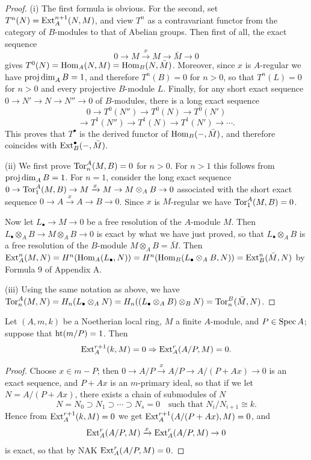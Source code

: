 \begin{proof}
(i) The first formula is obvious. For the second, set $T^n(N) =
\operatorname{Ext}^{n+1}_A(N, M)$, and view $T^n$ as a contravariant functor from the category
of $B$-modules to that of Abelian groups. Then first of all, the exact sequence
\[
  0 \to M \xrightarrow{x} M \to \bar{M} \to 0
\]
gives $T^0(N) = \operatorname{Hom}_A(N, M) = \operatorname{Hom}_B(N, \bar{M})$. Moreover, since $x$ is
$A$-regular we have $\operatorname{proj\,dim}_A B = 1$, and therefore $T^n(B) = 0$ for $n > 0$,
so that $T^n(L) = 0$ for $n > 0$ and every projective $B$-module $L$. Finally, for
any short exact sequence $0 \to N' \to N \to N'' \to 0$ of $B$-modules, there is
a long exact sequence
\[
  0 \to T^0(N'') \to T^0(N) \to T^0(N')
\]
\[
  \to T^1(N'') \to T^1(N) \to T^1(N') \to \cdots .
\]
This proves that $T^\bullet$ is the derived functor of $\operatorname{Hom}_B(-, \bar{M})$, and therefore
coincides with $\operatorname{Ext}^\bullet_B(-, \bar{M})$.

(ii) We first prove $\operatorname{Tor}^A_n(M, B) = 0$ for $n > 0$. For $n > 1$ this follows
from $\operatorname{proj\,dim}_A B = 1$. For $n = 1$, consider the long exact sequence
$0 \to \operatorname{Tor}^A_1(M, B) \to M \xrightarrow{x} M \to M \otimes_A B \to 0$ associated with the short
exact sequence $0 \to A \xrightarrow{x} A \to B \to 0$. Since $x$ is $M$-regular we have
$\operatorname{Tor}^A_1(M, B) = 0$.

Now let $L_\bullet \to M \to 0$ be a free resolution of the $A$-module $M$. Then
$L_\bullet \otimes_A B \to M \otimes_A B \to 0$ is exact by what we have just proved, so that
$L_\bullet \otimes_A B$ is a free resolution of the $B$-module $M \otimes_A B = \bar{M}$. Then $\operatorname{Ext}^n_A(M, N)
= H^n(\operatorname{Hom}_A(L_\bullet, N)) = H^n(\operatorname{Hom}_B(L_\bullet \otimes_A B, N)) = \operatorname{Ext}^n_B(\bar{M}, N)$ by Formula 9
of Appendix A.

(iii) Using the same notation as above, we have $\operatorname{Tor}^A_n(M, N) =
H_n(L_\bullet \otimes_A N) = H_n((L_\bullet \otimes_A B) \otimes_B N) = \operatorname{Tor}^B_n(\bar{M}, N)$.
\end{proof}

\begin{lemma}\label{lem:18.3}
Let $(A, m, k)$ be a Noetherian local ring, $M$ a finite $A$-module, and
$P \in \operatorname{Spec} A$; suppose that $\operatorname{ht} (m/P) = 1$. Then
\[
  \operatorname{Ext}^{r+1}_A(k, M) = 0 \Rightarrow \operatorname{Ext}^r_A(A/P, M) = 0.
\]
\end{lemma}

\begin{proof}
Choose $x \in m - P$; then $0 \to A/P \xrightarrow{x} A/P \to A/(P + Ax) \to 0$ is
an exact sequence, and $P + Ax$ is an $m$-primary ideal, so that if we let
$N = A/(P + Ax)$, there exists a chain of submodules of $N$
\[
  N = N_0 \supset N_1 \supset \cdots \supset N_s = 0 \quad \text{such that } N_i/N_{i+1} \cong k.
\]
Hence from $\operatorname{Ext}^{r+1}_A(k, M) = 0$ we get $\operatorname{Ext}^{r+1}_A(A/(P + Ax), M) = 0$, and
\[
  \operatorname{Ext}^r_A(A/P, M) \xrightarrow{x} \operatorname{Ext}^r_A(A/P, M) \to 0
\]
is exact, so that by NAK $\operatorname{Ext}^r_A(A/P, M) = 0$.
\end{proof}

